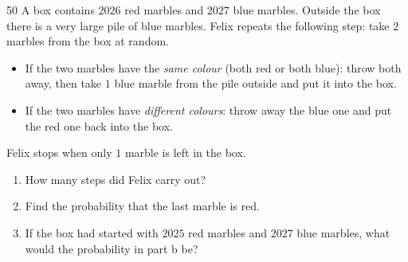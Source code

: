 \begin{probbox}{50}{}
A box contains $2026$ red marbles and $2027$ blue marbles. Outside the box there is a very large pile of blue marbles. Felix repeats the
following step: take $2$ marbles from the box at random.
\begin{itemize}[leftmargin=1.2em,itemsep=1pt,topsep=2pt]
\item If the two marbles have the \emph{same colour} (both red or both blue): throw both away, then take $1$ blue marble from the pile
outside and put it into the box.
\item If the two marbles have \emph{different colours}: throw away the blue one and put the red one back into the box.
\end{itemize}
Felix stops when only $1$ marble is left in the box.
\begin{enumerate}[label=\alph*),leftmargin=1.6em,itemsep=1pt,topsep=2pt]
\item How many steps did Felix carry out?
\item Find the probability that the last marble is red.
\item If the box had started with $2025$ red marbles and $2027$ blue marbles, what would the probability in part b be?
\end{enumerate}
\end{probbox}
